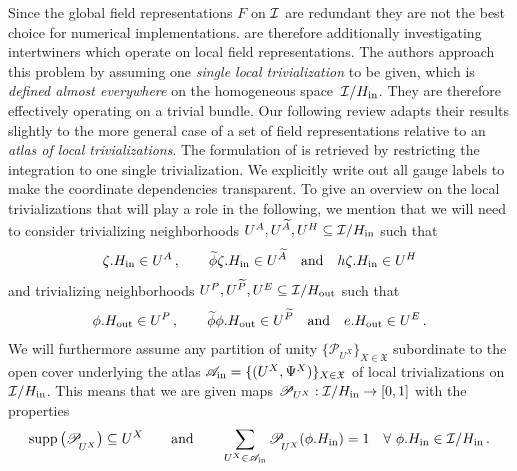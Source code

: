 Since the global field representations $F$ on $\mathcal{I}$ are redundant they are not the best choice for numerical implementations.
\citet{Cohen2018-intertwiners}\cite{Cohen2019-generaltheory} are therefore additionally investigating intertwiners which operate on local field representations.
The authors approach this problem by assuming one \emph{single local trivialization} to be given, which is \emph{defined almost everywhere} on the homogeneous space~$\mathcal{I}/H_{\textup{in}}$.
They are therefore effectively operating on a trivial bundle.
Our following review adapts their results slightly to the more general case of a set of field representations relative to an \emph{atlas of local trivializations}.
The formulation of \citet{Cohen2018-intertwiners}\cite{Cohen2019-generaltheory} is retrieved by restricting the integration to one single trivialization.
We explicitly write out all gauge labels to make the coordinate dependencies transparent.
To give an overview on the local trivializations that will play a role in the following, we mention that we will need to consider
trivializing neighborhoods $U^A, U^{\widetilde{A}}, U^H \subseteq \mathcal{I}/H_{\textup{in}}$ such that
\begin{align}
    \zeta.H_{\textup{in}}                   \in U^A \,, \qquad
    \widetilde{\phi}\zeta.H_{\textup{in}}   \in U^{\widetilde{A}} \quad \textup{and}\ \ \
    h\zeta.H_{\textup{in}}                  \in U^H
\end{align}
and trivializing neighborhoods $U^P, U^{\widetilde{P}}, U^E \subseteq \mathcal{I}/H_{\textup{out}}$ such that
\begin{align}
    \phi.H_{\textup{out}}                   \in U^P \,, \qquad
    \widetilde{\phi}\phi.H_{\textup{out}}   \in U^{\widetilde{P}} \quad \textup{and}\ \ \
    e.H_{\textup{out}}                  \in U^E \,.
\end{align}
We will furthermore assume any partition of unity
$\{ \mathscr{P}_{U^X} \}_{X\in\mathfrak{X}}$
subordinate to the open cover
underlying the atlas
$\mathscr{A}_\textup{in} = \{( U^X, \Psi^X )\}_{X\in\mathfrak{X}}$
of local trivializations on $\mathcal{I}/H_{\textup{in}}$.
This means that we are given maps $\mathscr{P}_{U^X}: \mathcal{I}/H_{\textup{in}} \to [0,1]$ with the properties
\begin{align}
    \operatorname{supp}\big( \mathscr{P}_{\!\overset{}{U^X}} \big) \subseteq U^X
    \qquad \textup{and} \qquad
    \sum_{U^X\in \mathscr{A}_\textup{in}} \mathscr{P}_{\!\overset{}{U^X}} (\phi.H_{\textup{in}}) = 1
    \quad \forall\ \phi.H_{\textup{in}} \in \mathcal{I}/H_{\textup{in}} \,.
\end{align}



